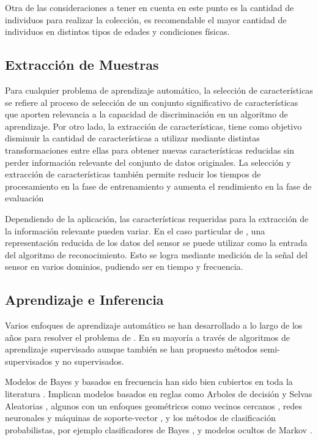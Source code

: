 Otra de las consideraciones a tener en cuenta en este punto es la
cantidad de individuos para realizar la colección, es recomendable
el mayor cantidad de individuos en distintos tipos de edades y condiciones
físicas.

\subsection{Extracción de Muestras}

Para cualquier problema de aprendizaje automático, la selección de
características se refiere al proceso de selección de un conjunto
significativo de características que aporten relevancia a la capacidad
de discriminación en un algoritmo de aprendizaje. Por otro lado, la
extracción de características, tiene como objetivo disminuir la cantidad
de características a utilizar mediante distintas transformaciones
entre ellas para obtener nuevas características reducidas sin perder
información relevante del conjunto de datos originales. La selección
y extracción de características también permite reducir los tiempos
de procesamiento en la fase de entrenamiento y aumenta el rendimiento
en la fase de evaluación

Dependiendo de la aplicación, las características requeridas para
la extracción de la información relevante pueden variar. En el caso
particular de , una representación reducida de los datos
del sensor se puede utilizar como la entrada del algoritmo de reconocimiento.
Esto se logra mediante medición de la señal del sensor en varios dominios,
pudiendo ser en tiempo y frecuencia.

\subsection{Aprendizaje e Inferencia}

Varios enfoques de aprendizaje automático se han desarrollado a lo
largo de los años para resolver el problema de . En su
mayoría a través de algoritmos de aprendizaje supervisado aunque también
se han propuesto métodos semi-supervisados y no supervisados.

Modelos de Bayes y basados en frecuencia han sido bien cubiertos en
toda la literatura . Implican modelos basados en reglas
como Arboles de decisión  y Selvas Aleatorias ,
algunos con un enfoques geométricos como vecinos cercanos ,
redes neuronales  y máquinas de soporte-vector ,
y los métodos de clasificación probabilistas, por ejemplo clasificadores
de Bayes , y modelos ocultos de Markov .

